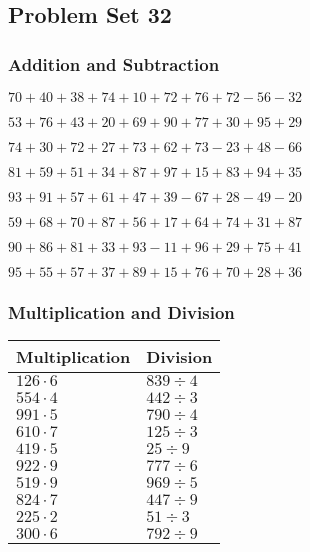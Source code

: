 \hypertarget{problem-set-32}{%
\subsection{Problem Set 32}\label{problem-set-32}}

\hypertarget{addition-and-subtraction}{%
\subsubsection{Addition and
Subtraction}\label{addition-and-subtraction}}

\(70+40+38+74+10+72+76+72-56-32\)

\(53+76+43+20+69+90+77+30+95+29\)

\(74+30+72+27+73+62+73-23+48-66\)

\(81+59+51+34+87+97+15+83+94+35\)

\(93+91+57+61+47+39-67+28-49-20\)

\(59+68+70+87+56+17+64+74+31+87\)

\(90+86+81+33+93-11+96+29+75+41\)

\(95+55+57+37+89+15+76+70+28+36\)

\hypertarget{multiplication-and-division}{%
\subsubsection{Multiplication and
Division}\label{multiplication-and-division}}

\begin{longtable}[]{@{}ll@{}}
\toprule
Multiplication & Division\tabularnewline
\midrule
\endhead
\(126\cdot6\) & \(839÷4\)\tabularnewline
\(554\cdot4\) & \(442÷3\)\tabularnewline
\(991\cdot5\) & \(790÷4\)\tabularnewline
\(610\cdot7\) & \(125÷3\)\tabularnewline
\(419\cdot5\) & \(25÷9\)\tabularnewline
\(922\cdot9\) & \(777÷6\)\tabularnewline
\(519\cdot9\) & \(969÷5\)\tabularnewline
\(824\cdot7\) & \(447÷9\)\tabularnewline
\(225\cdot2\) & \(51÷3\)\tabularnewline
\(300\cdot6\) & \(792÷9\)\tabularnewline
\bottomrule
\end{longtable}
